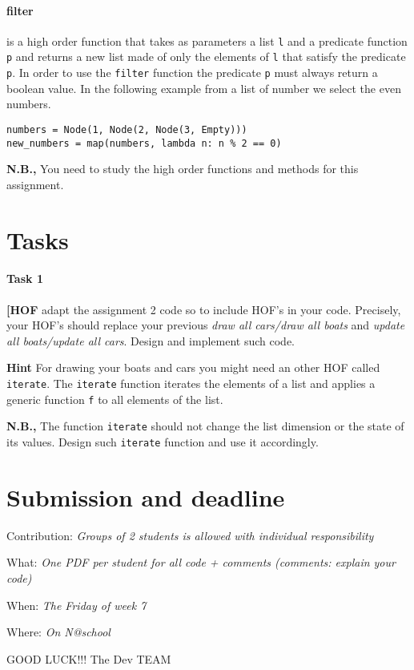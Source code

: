 \documentclass[10pt,a4paper]{article}
\begin{document}
\paragraph{filter} is a high order function that takes as parameters a list \texttt{l} and a predicate function \texttt{p} and returns a new list made of only the elements of \texttt{l} that satisfy the predicate \texttt{p}. In order to use the \texttt{filter} function the predicate \texttt{p} must always return a boolean value. In the following example from a list of number we select the even numbers.
\begin{lstlisting}[frame=single]
numbers = Node(1, Node(2, Node(3, Empty)))
new_numbers = map(numbers, lambda n: n % 2 == 0)
\end{lstlisting}

\noindent
\textbf{N.B.,} You need to study the high order functions and methods for this assignment.
	
\section{Tasks}	

\paragraph{Task 1} \textbf{[HOF} adapt the assignment 2 code so to include HOF's in your code. Precisely, your HOF's should replace your previous \textit{draw all cars/draw all boats} and \textit{update all boats/update all cars}. Design and implement such code.


\noindent
\textbf{Hint} For drawing your boats and cars you might need an other HOF called \texttt{iterate}. The \texttt{iterate} function iterates the elements of a list and applies a generic function \texttt{f} to all elements of the list. 


\noindent
\textbf{N.B.,} The function \texttt{iterate} should not change the list dimension or the state of its values. Design such \texttt{iterate} function and use it accordingly.

\section{Submission and deadline}

\noindent
Contribution: \textit{Groups of 2 students is allowed with individual responsibility}

\noindent
What: \textit{One PDF per student for all code + comments (comments: explain your code)}

\noindent
When: \textit{The Friday of week 7}

\noindent
Where: \textit{On N@school}


\huge
\centering
GOOD LUCK!!! The Dev TEAM \smiley

	
\end{document}
